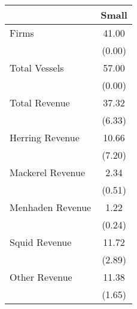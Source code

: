 \begin{tabular}{l*{1}{c}}
\hline\hline
                &    Small\\
\hline
Firms           &    41.00\\
                &   (0.00)\\
Total Vessels   &    57.00\\
                &   (0.00)\\
Total Revenue   &    37.32\\
                &   (6.33)\\
Herring Revenue &    10.66\\
                &   (7.20)\\
Mackerel Revenue&     2.34\\
                &   (0.51)\\
Menhaden Revenue&     1.22\\
                &   (0.24)\\
Squid Revenue   &    11.72\\
                &   (2.89)\\
Other Revenue   &    11.38\\
                &   (1.65)\\
\hline\hline
\end{tabular}
